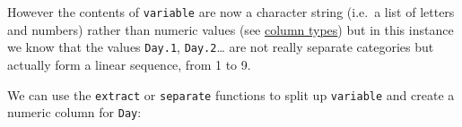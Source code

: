 \documentclass[]{article}
\newenvironment{Shaded}{\begin{snugshade}}{\end{snugshade}}
\newcommand{\DataTypeTok}[1]{\textcolor[rgb]{0.13,0.29,0.53}{#1}}
\newcommand{\DecValTok}[1]{\textcolor[rgb]{0.00,0.00,0.81}{#1}}
\newcommand{\FloatTok}[1]{\textcolor[rgb]{0.00,0.00,0.81}{#1}}
\newcommand{\KeywordTok}[1]{\textcolor[rgb]{0.13,0.29,0.53}{\textbf{#1}}}
\newcommand{\NormalTok}[1]{#1}
\newcommand{\OperatorTok}[1]{\textcolor[rgb]{0.81,0.36,0.00}{\textbf{#1}}}
\newcommand{\StringTok}[1]{\textcolor[rgb]{0.31,0.60,0.02}{#1}}
\begin{document}
\begin{Shaded}
\end{Shaded}

However the contents of \texttt{variable} are now a character string (i.e.~a list of
letters and numbers) rather than numeric values (see
\protect\hyperlink{factors-and-numerics}{column types}) but in this instance we know that the
values \texttt{Day.1}, \texttt{Day.2}\ldots{} are not really separate categories but actually form
a linear sequence, from 1 to 9.

We can use the \texttt{extract} or \texttt{separate} functions to split up \texttt{variable} and
create a numeric column for \texttt{Day}:

\begin{Shaded}
\end{Shaded}
\end{document}
